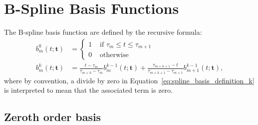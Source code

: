 \documentclass{article}
\begin{document}
\section{B-Spline Basis Functions}
\label{sec:b-spline-basis-functions}

The B-spline basis function are defined by the recursive formula:
\begin{align}
b_m^0(t; \mathbf{t}) &= \begin{cases} 1 & \text{~if~} \tau_m \leq t \leq \tau_{m+1} \\ 
 									 0 & \text{~otherwise} 
 					   \end{cases} 
	\label{eq:spline_basis_definition_0}\\	
b_m^k(t; \mathbf{t}) &= \frac{t-\tau_m}{\tau_{m+k}-
\tau_m} b_m^{k-1}(t; \mathbf{t}) + \frac{\tau_{m+k+1}-t}{\tau_{m+k+1}-\tau_{m+1}} b_{m+1}^{k-1}(t; \mathbf{t}),
	\label{eq:spline_basis_definition_k}
\end{align}
where by convention, a divide by zero in Equation~\eqref{eq:spline_basis_definition_k} is interpreted to mean that the associated term is zero.

\subsection{Zeroth order basis}
\end{document}
